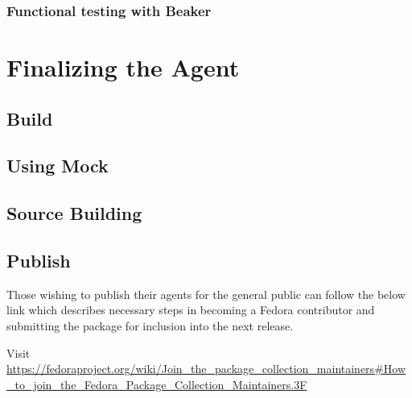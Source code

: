 \documentclass[a4paper,12pt]{article}
\begin{document}
\subsubsection{Functional testing with Beaker}
\newpage
\section{Finalizing the Agent}
\subsection{Build}
\subsection{Using Mock}
\subsection{Source Building}
\subsection{Publish}
Those wishing to publish their agents for the general public can follow the
below link which describes necessary steps in becoming a Fedora contributor 
and submitting the package for inclusion into the next release.

Visit\\
\url{https://fedoraproject.org/wiki/Join\_the\_package\_collection\_maintainers#How\_to\_join\_the\_Fedora\_Package\_Collection\_Maintainers.3F}
\end{document}
